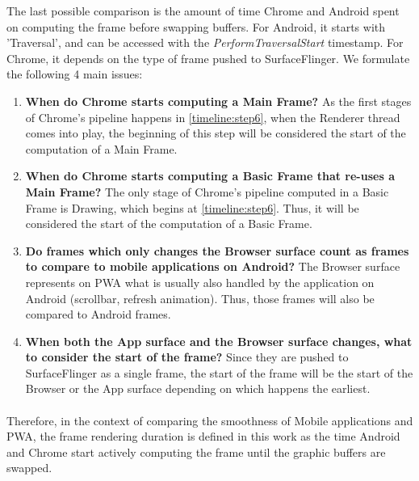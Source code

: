 \documentclass{kththesis}
\begin{document}
The last possible comparison is the amount of time Chrome and Android spent on computing the frame before swapping buffers. For Android, it starts with 'Traversal', and can be accessed with the \textit{PerformTraversalStart} timestamp. For Chrome, it depends on the type of frame pushed to SurfaceFlinger. We formulate the following 4 main issues:
\begin{enumerate}
    \item \textbf{When do Chrome starts computing a Main Frame?} \newline
    As the first stages of Chrome's pipeline happens in \ref{timeline:step6}, when the Renderer thread comes into play, the beginning of this step will be considered the start of the computation of a Main Frame.
    \item \textbf{When do Chrome starts computing a Basic Frame that re-uses a Main Frame?} \newline
    The only stage of Chrome's pipeline computed in a Basic Frame is Drawing, which begins at \ref{timeline:step6}. Thus, it will be considered the start of the computation of a Basic Frame.
    \item \textbf{Do frames which only changes the Browser surface count as frames to compare to mobile applications on Android?} \newline
    The Browser surface represents on PWA what is usually also handled by the application on Android (scrollbar, refresh animation). Thus, those frames will also be compared to Android frames. 
    \item \textbf{When both the App surface and the Browser surface changes, what to consider the start of the frame?} \newline
    Since they are pushed to SurfaceFlinger as a single frame, the start of the frame will be the start of the Browser or the App surface depending on which happens the earliest.
\end{enumerate}

\paragraph{}
Therefore, in the context of comparing the smoothness of Mobile applications and PWA, the frame rendering duration is defined in this work as the time Android and Chrome start actively computing the frame until the graphic buffers are swapped.
\end{document}
